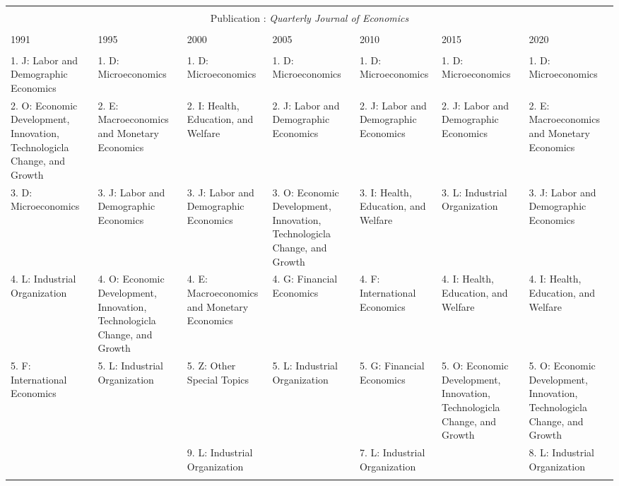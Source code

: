 
\begin{table}[h] \centering 
  \caption{} 
  \label{} 
\begin{tabular}{@{\extracolsep{5pt}} lllllll} 
\\[-1.8ex]\hline 
\hline \\[-1.8ex] \multicolumn{7}{c}{Publication : \textit{Quarterly Journal of Economics}} \\
 \cline{1-7} \\
1991 & 1995 & 2000 & 2005 & 2010 & 2015 & 2020 \\ 
\hline \\[-1.8ex] 
1. J: Labor and Demographic Economics & 1. D: Microeconomics & 1. D: Microeconomics & 1. D: Microeconomics & 1. D: Microeconomics & 1. D: Microeconomics & 1. D: Microeconomics \\ 
2. O: Economic Development, Innovation, Technologicla Change, and Growth & 2. E: Macroeconomics and Monetary Economics & 2. I: Health, Education, and Welfare & 2. J: Labor and Demographic Economics & 2. J: Labor and Demographic Economics & 2. J: Labor and Demographic Economics & 2. E: Macroeconomics and Monetary Economics \\ 
3. D: Microeconomics & 3. J: Labor and Demographic Economics & 3. J: Labor and Demographic Economics & 3. O: Economic Development, Innovation, Technologicla Change, and Growth & 3. I: Health, Education, and Welfare & 3. L: Industrial Organization & 3. J: Labor and Demographic Economics \\ 
4. L: Industrial Organization & 4. O: Economic Development, Innovation, Technologicla Change, and Growth & 4. E: Macroeconomics and Monetary Economics & 4. G: Financial Economics & 4. F: International Economics & 4. I: Health, Education, and Welfare & 4. I: Health, Education, and Welfare \\ 
5. F: International Economics & 5. L: Industrial Organization & 5. Z: Other Special Topics & 5. L: Industrial Organization & 5. G: Financial Economics & 5. O: Economic Development, Innovation, Technologicla Change, and Growth & 5. O: Economic Development, Innovation, Technologicla Change, and Growth \\ 
 &  & 9. L: Industrial Organization &  & 7. L: Industrial Organization &  & 8. L: Industrial Organization \\ 
\hline \\[-1.8ex] 
\end{tabular} 
\end{table} 
